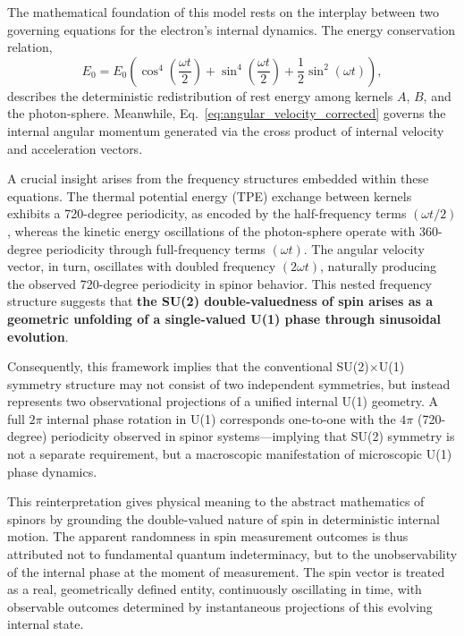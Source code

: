 \documentclass[%
 reprint,
 amsmath,amssymb,
 aps,
]{revtex4-1}
\numberwithin{equation}{section}%
\begin{document}
The mathematical foundation of this model rests on the interplay between two governing equations for the electron’s internal dynamics. The energy conservation relation,
\begin{equation}
E_{0} = E_{0} \left( \cos^{4} \left( \frac{\omega t}{2} \right) + \sin^{4} \left( \frac{\omega t}{2} \right) + \frac{1}{2} \sin^{2} (\omega t) \right),
\label{eq:total_hamiltonian_ref}
\end{equation}
describes the deterministic redistribution of rest energy among kernels $A$, $B$, and the photon-sphere. Meanwhile, Eq.~\eqref{eq:angular_velocity_corrected} governs the internal angular momentum generated via the cross product of internal velocity and acceleration vectors.

A crucial insight arises from the frequency structures embedded within these equations. The thermal potential energy (TPE) exchange between kernels exhibits a 720-degree periodicity, as encoded by the half-frequency terms $(\omega t / 2)$, whereas the kinetic energy oscillations of the photon-sphere operate with 360-degree periodicity through full-frequency terms $(\omega t)$. The angular velocity vector, in turn, oscillates with doubled frequency $(2\omega t)$, naturally producing the observed 720-degree periodicity in spinor behavior. This nested frequency structure suggests that \textbf{the SU(2) double-valuedness of spin arises as a geometric unfolding of a single-valued U(1) phase through sinusoidal evolution}.

Consequently, this framework implies that the conventional SU(2)$\times$U(1) symmetry structure may not consist of two independent symmetries, but instead represents two observational projections of a unified internal U(1) geometry. A full $2\pi$ internal phase rotation in U(1) corresponds one-to-one with the $4\pi$ (720-degree) periodicity observed in spinor systems—implying that SU(2) symmetry is not a separate requirement, but a macroscopic manifestation of microscopic U(1) phase dynamics.

This reinterpretation gives physical meaning to the abstract mathematics of spinors by grounding the double-valued nature of spin in deterministic internal motion. The apparent randomness in spin measurement outcomes is thus attributed not to fundamental quantum indeterminacy, but to the unobservability of the internal phase at the moment of measurement. The spin vector is treated as a real, geometrically defined entity, continuously oscillating in time, with observable outcomes determined by instantaneous projections of this evolving internal state.
\end{document}
